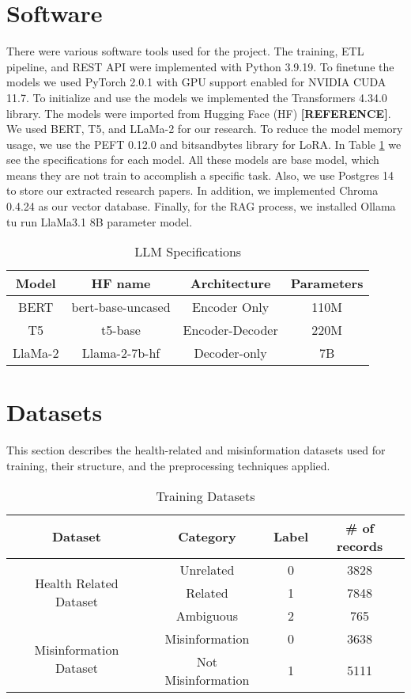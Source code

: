 \section{Software}
There were various software tools used for the project. The training, ETL pipeline,
and REST API were implemented with Python 3.9.19. To finetune the models we used PyTorch 2.0.1 with GPU support enabled for
NVIDIA CUDA 11.7. To initialize and use the models we implemented the Transformers 4.34.0 library. The models were imported from
Hugging Face (HF) \textbf{[REFERENCE]}. We used BERT, T5, and LLaMa-2 for our research. To reduce the model memory usage, we use
the PEFT 0.12.0 and bitsandbytes library for LoRA. In Table \ref{table:LLM} we see the specifications for each model. All these models are base
model, which means they are not train to accomplish a specific task. Also, we use Postgres 14 to store our extracted research papers. In addition, we
implemented Chroma 0.4.24 as our vector database. Finally, for the RAG process, we installed Ollama tu run LlaMa3.1 8B parameter model. 


  \begin{table}[ht!]
\centering
\caption{LLM Specifications}
\begin{tabular}{||c | c | c | c||} 
 \hline
\textbf{Model} & \textbf{HF name} & \textbf{Architecture} & \textbf{Parameters} \\ [0.5ex] 
 \hline
 BERT & bert-base-uncased & Encoder Only & 110M \\ 
 \hline
 T5 & t5-base & Encoder-Decoder & 220M \\
 \hline
 LlaMa-2 & Llama-2-7b-hf & Decoder-only & 7B \\
 \hline
\end{tabular}
\label{table:LLM}
\end{table}
 


\section{Datasets}

This section describes the health-related and misinformation datasets used for training, their structure, and the preprocessing techniques applied.

\begin{table}[H]
	\centering
	\caption{Training Datasets}
	\begin{tabular}{||c | c | c| c||} 
		\hline
		\textbf{Dataset} &
		\textbf{Category} & \textbf{Label}& \textbf{\# of records} \\ [1.5ex] 
		\hline
		\multirow{3}{6.75em}{Health Related Dataset} & Unrelated & 0 & 3828  \\[1ex]
		& Related & 1 & 7848  \\ [1ex]
		& Ambiguous & 2 & 765 \\[1ex]
		\hline
		\multirow{2}{6.75em}{Misinformation Dataset} & Misinformation & 0 & 3638\\ [1ex]
		& Not Misinformation & 1 & 5111  \\[1ex]
		\hline
	\end{tabular}
	\label{table:dataset}
\end{table}


